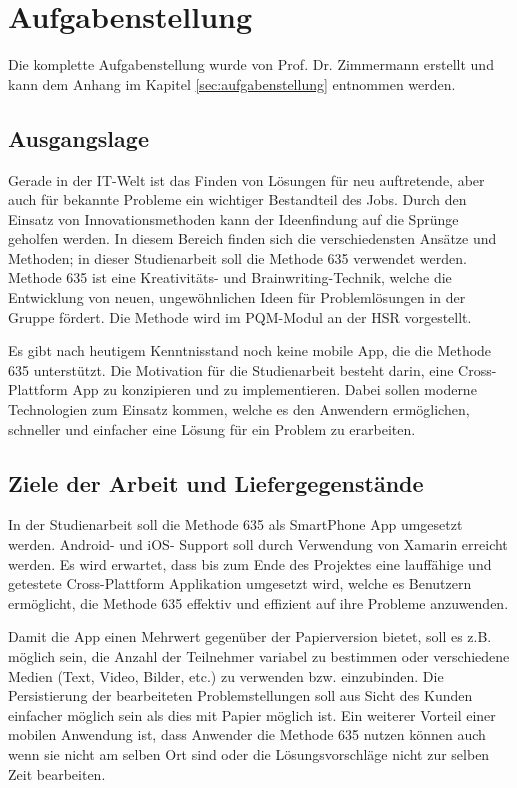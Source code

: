 
\thispagestyle{empty}
\section*{Aufgabenstellung}

Die komplette Aufgabenstellung wurde von Prof. Dr. Zimmermann erstellt und kann dem Anhang im Kapitel \ref{sec:aufgabenstellung} entnommen werden.

\subsection*{Ausgangslage}
Gerade in der IT-Welt ist das Finden von Lösungen für neu auftretende, aber auch für bekannte Probleme ein wichtiger Bestandteil des Jobs. Durch den Einsatz von Innovationsmethoden kann der Ideenfindung auf die Sprünge geholfen werden. In diesem Bereich finden sich die verschiedensten Ansätze und Methoden; in dieser Studienarbeit soll die Methode 635 \cite{methode-635} verwendet werden. Methode 635 ist eine Kreativitäts- und Brainwriting-Technik, welche die Entwicklung von neuen, ungewöhnlichen Ideen für Problemlösungen in der Gruppe fördert. Die Methode wird im PQM-Modul an der HSR vorgestellt.
 
Es gibt nach heutigem Kenntnisstand noch keine mobile App, die die Methode 635 unterstützt. Die Motivation für die Studienarbeit besteht darin, eine Cross-Plattform App zu konzipieren und zu implementieren. Dabei sollen moderne Technologien zum Einsatz kommen, welche es den Anwendern ermöglichen, schneller und einfacher eine Lösung für ein Problem zu erarbeiten.
\subsection*{Ziele der Arbeit und Liefergegenstände}\label{subsec:ziele}
In der Studienarbeit soll die Methode 635 als SmartPhone App umgesetzt werden. Android- und iOS- Support soll durch Verwendung von Xamarin erreicht werden.
Es wird erwartet, dass bis zum Ende des Projektes eine lauffähige und getestete Cross-Plattform Applikation umgesetzt wird, welche es Benutzern ermöglicht, die Methode 635 effektiv und effizient auf ihre Probleme anzuwenden. 

Damit die App einen Mehrwert gegenüber der Papierversion bietet, soll es z.B. möglich sein, die Anzahl der Teilnehmer variabel zu bestimmen oder verschiedene Medien (Text, Video, Bilder, etc.) zu verwenden bzw. einzubinden. Die Persistierung der bearbeiteten Problemstellungen soll aus Sicht des Kunden einfacher möglich sein als dies mit Papier möglich ist. Ein weiterer Vorteil einer mobilen Anwendung ist, dass Anwender die Methode 635 nutzen können auch wenn sie nicht am selben Ort sind oder die Lösungsvorschläge nicht zur selben Zeit bearbeiten. 

